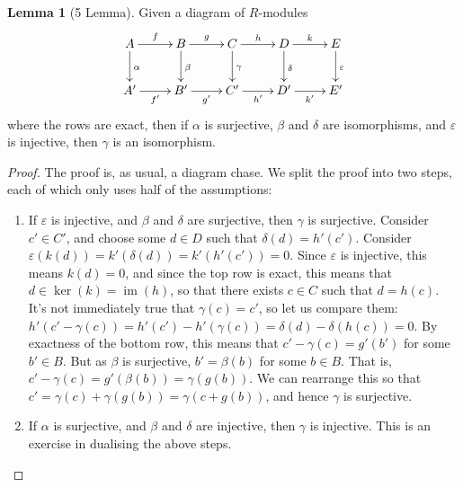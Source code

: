 \documentclass{tufte-handout}
\DeclareMathOperator{\im}{im}
\theoremstyle{definition}
\newtheorem{lemma}{Lemma}
\begin{document}
\begin{lemma}[5 Lemma]
Given a diagram of $R$-modules
\[
	\xymatrix{
	A\ar[r]^f \ar[d]^\alpha & B \ar[r]^g \ar[d]^\beta & C \ar[r]^h \ar[d]^\gamma & D \ar[r]^k \ar[d]^\delta & E \ar[d]^\varepsilon \\
	A' \ar[r]_{f'} & B' \ar[r]_{g'} & C' \ar[r]_{h'} & D' \ar[r]_{k'} & E'
	}
\]
where the rows are exact, then if $\alpha$ is surjective, $\beta$ and $\delta$ are isomorphisms, and $\varepsilon$ is injective, then $\gamma$ is an isomorphism.
\end{lemma}

\begin{proof}
The proof is, as usual, a diagram chase. We split the proof into two steps, each of which only uses half
of the assumptions:
\begin{enumerate}

\item If $\varepsilon$ is injective, and $\beta$ and $\delta$ are surjective, then $\gamma$ is 
surjective. Consider $c' \in C'$, and choose some $d\in D$ such that $\delta(d) = h'(c')$. 
Consider $\varepsilon(k(d)) = k'(\delta(d)) = k'(h'(c')) = 0$. Since $\varepsilon$ is injective, 
this means $k(d)=0$, and since the top row is exact, this means that $d\in \ker(k) = \im(h)$, so 
that there exists $c\in C$ such that $d=h(c)$. It's not immediately true that $\gamma(c) = c'$, 
so let us compare them: $h'(c'-\gamma(c)) = h'(c') - h'(\gamma(c)) = \delta(d) - \delta(h(c)) = 
0$. By exactness of the bottom row, this means that $c' - \gamma(c) = g'(b')$ for some $b'\in 
B$. But as $\beta$ is surjective, $b' = \beta(b)$ for some $b\in B$. That is, $c' - \gamma(c) = 
g'(\beta(b)) = \gamma(g(b))$. We can rearrange this so that $c' = \gamma(c) + \gamma(g(b)) = \gamma(c+g(b))$, and hence $\gamma$ is surjective.

\item If $\alpha$ is surjective, and $\beta$ and $\delta$ are injective, then $\gamma$ is injective. This is an exercise in dualising the above steps.\qedhere
\end{enumerate}
\end{proof}
\end{document}
